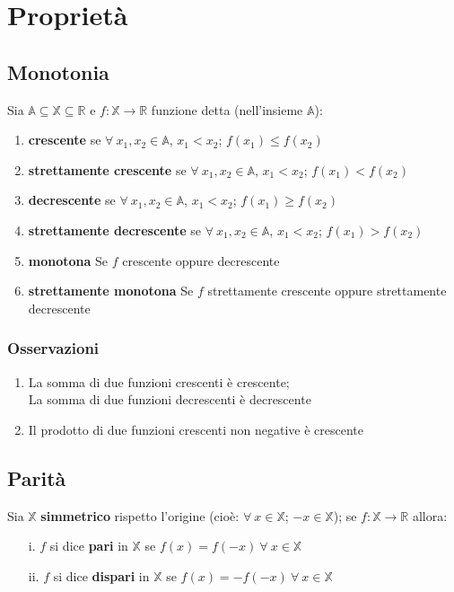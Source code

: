 \section{Proprietà}
\subsection{Monotonia}
Sia $\mathbb{A} \subseteq \mathbb{X} \subseteq \mathbb{R}$ e $f: \mathbb{X} \rightarrow \mathbb{R}$ funzione detta (nell'insieme $\mathbb{A}$):
\begin{enumerate}
\item \textbf{crescente} se $\forall\ x_1,x_2 \in \mathbb{A}$, $x_1<x_2$; $f(x_1) \leq f(x_2)$
\item \textbf{strettamente crescente} se $\forall\ x_1,x_2 \in \mathbb{A}$, $x_1<x_2$; $f(x_1) < f(x_2)$
\item \textbf{decrescente} se $\forall\ x_1,x_2 \in \mathbb{A}$, $x_1<x_2$; $f(x_1) \geq f(x_2)$
\item \textbf{strettamente decrescente} se $\forall\ x_1,x_2 \in \mathbb{A}$, $x_1<x_2$; $f(x_1) > f(x_2)$
\item \textbf{monotona} Se $f$ crescente oppure decrescente
\item \textbf{strettamente monotona} Se $f$ strettamente crescente oppure strettamente decrescente
\end{enumerate}
\subsubsection{Osservazioni}
\begin{enumerate}
\item La somma di due funzioni crescenti è crescente;\\
La somma di due funzioni decrescenti è decrescente
\item Il prodotto di due funzioni crescenti non negative è crescente
\end{enumerate}

\subsection{Parità}
Sia $\mathbb{X}$ \textbf{simmetrico} rispetto l'origine (cioè: $\forall\ x \in \mathbb{X}$; $-x \in \mathbb{X}$); se $f: \mathbb{X} \rightarrow \mathbb{R}$ allora:
\begin{enumerate}
\item[i.] $f$ si dice \textbf{pari} in $\mathbb{X}$ se $f(x) = f(-x)\ \forall\ x \in \mathbb{X}$
\item[ii.] $f$ si dice \textbf{dispari} in $\mathbb{X}$ se $f(x) = -f(-x)\ \forall\ x \in \mathbb{X}$
\end{enumerate}

